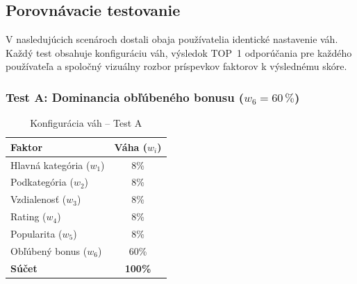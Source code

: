 \subsection{Porovnávacie testovanie}

V nasledujúcich scenároch dostali obaja používatelia identické nastavenie váh. Každý test obsahuje konfiguráciu váh, výsledok TOP~1 odporúčania pre každého používateľa a spoločný vizuálny rozbor príspevkov faktorov k výslednému skóre.

\subsubsection{Test A: Dominancia obľúbeného bonusu ($w_6 = 60\,\%$)}

\begin{table}[H]
\centering
\caption{Konfigurácia váh – Test A}
\label{tab:vahy_testA}
\begin{tabular}{|l|c|}
\hline
\textbf{Faktor} & \textbf{Váha ($w_i$)} \\ \hline
Hlavná kategória ($w_1$) & 8\% \\
Podkategória ($w_2$)     & 8\% \\
Vzdialenosť ($w_3$)      & 8\% \\
Rating ($w_4$)           & 8\% \\
Popularita ($w_5$)       & 8\% \\
Obľúbený bonus ($w_6$)   & 60\% \\ \hline
\textbf{Súčet}           & \textbf{100\%} \\ \hline
\end{tabular}
\end{table}


